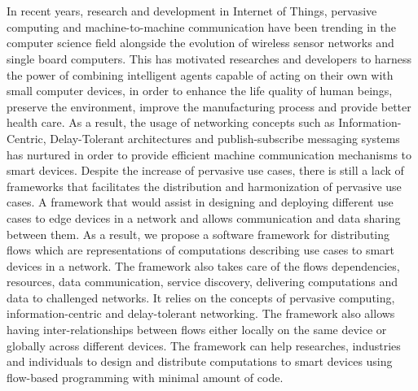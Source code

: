 \chapter{\abstractname}
In recent years, research and development in Internet of Things, pervasive computing and machine-to-machine communication have been trending in the computer science field alongside the evolution of wireless sensor networks and single board computers. 
This has  motivated researches and developers to harness the power of combining intelligent agents capable of acting on their own with small computer devices, in order to enhance the  life quality of human beings, preserve the environment, improve the manufacturing  process and provide better health care. As a result, the usage of networking concepts such as Information-Centric, Delay-Tolerant architectures and publish-subscribe messaging systems has nurtured in order to provide efficient machine communication mechanisms to smart devices. Despite the increase of pervasive use cases, there is still a lack of frameworks that facilitates the distribution and harmonization of pervasive use cases. A framework that would assist in designing and deploying different use cases to edge devices in a network and allows communication and data sharing between them.  As a result, we propose a software framework for distributing flows which are representations of computations describing use cases to smart devices in a network. The framework also takes care of the flows dependencies, resources, data communication, service discovery, delivering computations and data to challenged networks. It relies on the concepts of pervasive computing, information-centric and delay-tolerant networking. The framework also allows having inter-relationships between flows either locally on the same device or globally across different devices. The framework can help researches, industries and individuals to design and distribute computations to smart devices using flow-based programming with minimal amount of code.